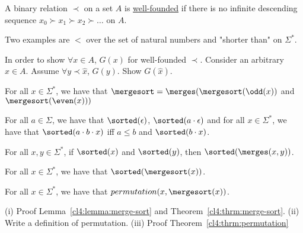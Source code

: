 \begin{definition} A binary relation $\prec$ on a set $A$ is  \underline{well-founded} if there is no infinite descending sequence $x_0 \succ x_1 \succ x_2 \succ \ldots$ on $A$.
\end{definition}

\begin{example} Two examples are $<$ over the set of natural numbers and "shorter than" on $\Sigma^*$.
\end{example}


\begin{remark}
 In order to show $\forall x\in A$, $G(x)$ for well-founded $\prec$. Consider an arbitrary $\hat{x} \in A$.
Assume $\forall y \prec \hat{x}$, $G(y)$.
Show $G(\hat{x})$.
\end{remark}



\begin{definition}[$\mergesort$] For all $x \in \Sigma^*$, we have that $\mergesort = \merges(\mergesort(\odd(x))$ and  $\mergesort(\even(x)))$
\end{definition}

\begin{definition}[$\sorted$] For all $a \in \Sigma$, we have that $\sorted(\epsilon)$, $\sorted(a\cdot\epsilon)$ and for all $x\in \Sigma^*$, we have that $\sorted(a\cdot b\cdot x)$ iff $a\leq b$ and $\sorted(b\cdot x)$.
\end{definition}

\begin{lemma}
\label{cl4:lemma:merge-sort}
For all $x,y \in \Sigma^*$, if $\sorted(x)$ and $\sorted(y)$, then $\sorted(\merges(x,y))$.
\end{lemma}


\begin{theorem}
\label{cl4:thrm:merge-sort}
For all $x\in \Sigma^*$, we have that $\sorted(\mergesort(x))$.
\end{theorem}


\begin{theorem}[Permutation]
\label{cl4:thrm:permutation}
For all $x \in \Sigma^*$, we have that $permutation(x, \mergesort(x))$.
\end{theorem}


\begin{exercise}
 (i) Proof Lemma~\ref{cl4:lemma:merge-sort} and Theorem~\ref{cl4:thrm:merge-sort}. (ii) Write a definition of permutation. 
 (iii) Proof Theorem~\ref{cl4:thrm:permutation}
\end{exercise}


